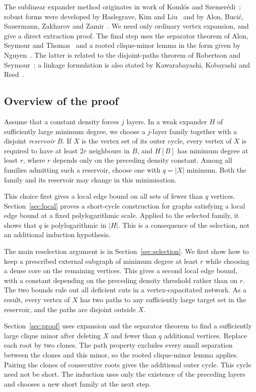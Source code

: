 \documentclass[10pt,letterpaper]{article}
\theoremstyle{definition}
\theoremstyle{remark}
\begin{document}
The sublinear expander method originates in work of Koml\'os and Szemer\'edi~\cite{KS}; robust forms were developed by Haslegrave, Kim and Liu~\cite{HKL} and by Alon, Buci\'c, Sauermann, Zakharov and Zamir~\cite{ABSZZ}. We need only ordinary vertex expansion, and give a direct extraction proof. The final step uses the separator theorem of Alon, Seymour and Thomas~\cite{AST} and a rooted clique-minor lemma in the form given by Nguyen~\cite{Nguyen}. The latter is related to the disjoint-paths theorem of Robertson and Seymour~\cite{RS}; a linkage formulation is also stated by Kawarabayashi, Kobayashi and Reed~\cite{KKR}.

\subsection*{Overview of the proof}

Assume that a constant density forces $j$ layers. In a weak expander $H$ of sufficiently large minimum degree, we choose a $j$-layer family together with a disjoint \emph{reservoir} $B$. If $X$ is the vertex set of its outer cycle, every vertex of $X$ is required to have at least $2r$ neighbours in $B$, and $H[B]$ has minimum degree at least $r$, where $r$ depends only on the preceding density constant. Among all families admitting such a reservoir, choose one with $q=|X|$ minimum. Both the family and its reservoir may change in this minimisation.

This choice first gives a local edge bound on all sets of fewer than $q$ vertices. Section~\ref{sec:local} proves a short-cycle construction for graphs satisfying a local edge bound at a fixed polylogarithmic scale. Applied to the selected family, it shows that $q$ is polylogarithmic in $|H|$. This is a consequence of the selection, not an additional induction hypothesis.

The main reselection argument is in Section~\ref{sec:selection}. We first show how to keep a prescribed external subgraph of minimum degree at least $r$ while choosing a dense core on the remaining vertices. This gives a second local edge bound, with a constant depending on the preceding density threshold rather than on $r$. The two bounds rule out all deficient cuts in a vertex-capacitated network. As a result, every vertex of $X$ has two paths to any sufficiently large target set in the reservoir, and the paths are disjoint outside $X$.

Section~\ref{sec:proof} uses expansion and the separator theorem to find a sufficiently large clique minor after deleting $X$ and fewer than $q$ additional vertices. Replace each root by two clones. The path property excludes every small separation between the clones and this minor, so the rooted clique-minor lemma applies. Pairing the clones of consecutive roots gives the additional outer cycle. This cycle need not be short. The induction uses only the existence of the preceding layers and chooses a new short family at the next step.
\end{document}
